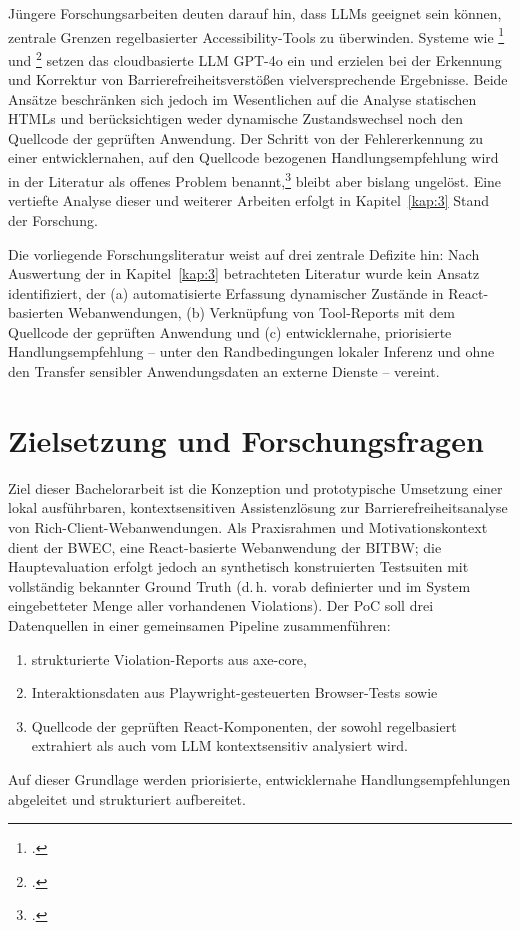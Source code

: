 Jüngere Forschungsarbeiten deuten darauf hin, dass \acs{LLM}s geeignet sein können, zentrale Grenzen regelbasierter Accessibility-Tools zu überwinden. Systeme wie \footcite[Vgl.][]{fathallah_accessguru_2025} und \footcite[Vgl.][FSE101:10--11]{he_enhancing_2025} setzen das cloudbasierte \ac{LLM} GPT-4o ein und erzielen bei der \mbox{Erkennung} und Korrektur von Barrierefreiheitsverstößen vielversprechende Ergebnisse. Beide Ansätze beschränken sich jedoch im Wesentlichen auf die Analyse statischen \acs{HTML}s und berücksichtigen weder dynamische Zustandswechsel noch den Quellcode der geprüften Anwendung. Der Schritt von der Fehlererkennung zu einer entwicklernahen, auf den Quellcode bezogenen Handlungsempfehlung wird in der Literatur als offenes Problem benannt,\footcite[Vgl.][FSE101:15--17]{he_enhancing_2025} bleibt aber bislang ungelöst. Eine vertiefte Analyse dieser und weiterer Arbeiten erfolgt in Kapitel~\ref{kap:3} \glqq{}Stand der Forschung\grqq{}.

Die vorliegende Forschungsliteratur weist auf drei zentrale Defizite hin: Nach Auswertung der in Kapitel~\ref{kap:3} betrachteten Literatur wurde kein Ansatz identifiziert, der (a) automatisierte Erfassung dynamischer Zustände in React-basierten Webanwendungen, (b) Verknüpfung von Tool-Reports mit dem Quellcode der geprüften Anwendung und (c) entwicklernahe, priorisierte Handlungsempfehlung -- unter den Randbedingungen lokaler Inferenz und ohne den Transfer sensibler Anwendungsdaten an externe Dienste -- vereint.

\section{Zielsetzung und Forschungsfragen} \label{kap:1.3}

Ziel dieser Bachelorarbeit ist die Konzeption und prototypische Umsetzung einer lokal ausführbaren, kontextsensitiven Assistenzlösung zur Barrierefreiheitsanalyse von Rich-Client-Web\-an\-wen\-dun\-gen. Als Praxisrahmen und Motivationskontext dient der \ac{BWEC}, eine React-basierte Webanwendung der \ac{BITBW}; die Hauptevaluation erfolgt jedoch an synthetisch konstruierten Testsuiten mit vollständig bekannter Ground Truth (d.\,h. vorab definierter und im System eingebetteter Menge aller vorhandenen Violations). Der \ac{PoC} soll drei Datenquellen in einer gemeinsamen Pipeline zusammenführen:
\begin{enumerate}
  \item strukturierte Violation-Reports aus axe-core,
  \item Interaktionsdaten aus Playwright-gesteuerten Browser-Tests sowie
  \item Quellcode der geprüften React-Komponenten, der sowohl regelbasiert extrahiert als auch vom \ac{LLM} kontextsensitiv analysiert wird.
\end{enumerate}
Auf dieser Grundlage werden priorisierte, entwicklernahe Handlungsempfehlungen abgeleitet und strukturiert aufbereitet. %

